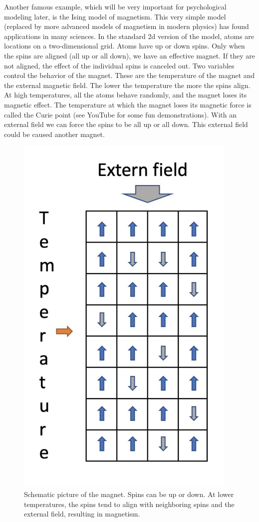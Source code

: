 \documentclass[
  a4paper,
  DIV=11,
  numbers=noendperiod,
  oneside]{scrreprt}
\begin{document}
Another famous example, which will be very important for psychological
modeling later, is the Ising model of magnetism. This very simple model
(replaced by more advanced models of magnetism in modern physics) has
found applications in many sciences. In the standard 2d version of the
model, atoms are locations on a two-dimensional grid. Atoms have up or
down spins. Only when the spins are aligned (all up or all down), we
have an effective magnet. If they are not aligned, the effect of the
individual spins is canceled out. Two variables control the behavior of
the magnet. These are the temperature of the magnet and the external
magnetic field. The lower the temperature the more the spins align. At
high temperatures, all the atoms behave randomly, and the magnet loses
its magnetic effect. The temperature at which the magnet loses its
magnetic force is called the Curie point (see YouTube for some fun
demonstrations). With an external field we can force the spins to be all
up or all down. This external field could be caused another magnet.

\begin{figure}

{\centering \includegraphics[width=4.16667in,height=\textheight]{media/ch5n/image1.jpg}

}

\caption{\label{fig-ch5n-img1-old-39}Schematic picture of the magnet.
Spins can be up or down. At lower temperatures, the spins tend to align
with neighboring spins and the external field, resulting in magnetism.}

\end{figure}
\end{document}
